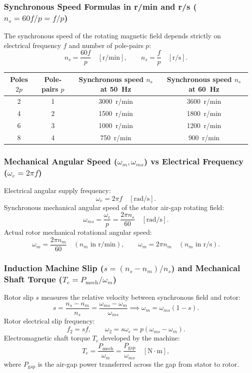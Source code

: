 \subsubsection{Synchronous Speed Formulas in r/min and r/s ($n_s = 60f/p = f/p$)}
The synchronous speed of the rotating magnetic field depends strictly on electrical frequency $f$ and number of pole-pairs $p$:
\[
n_s = \frac{60 f}{p}\quad[\mathrm{r/min}],
\qquad
n_s = \frac{f}{p}\quad[\mathrm{r/s}].
\]
\begin{center}
\begin{tabular}{@{}cccc@{}}
\toprule
Poles $2p$ & Pole-pairs $p$ & Synchronous speed $n_s$ at \SI{50}{\hertz} & Synchronous speed $n_s$ at \SI{60}{\hertz}\\
\midrule
2 & 1 & \SI{3000}{r/min} & \SI{3600}{r/min}\\
4 & 2 & \SI{1500}{r/min} & \SI{1800}{r/min}\\
6 & 3 & \SI{1000}{r/min} & \SI{1200}{r/min}\\
8 & 4 & \SI{750}{r/min}  & \SI{900}{r/min}\\
\bottomrule
\end{tabular}
\end{center}

\subsubsection{Mechanical Angular Speed ($\omega_m, \omega_{ms}$) vs Electrical Frequency ($\omega_e = 2\pi f$)}
Electrical angular supply frequency:
\[
\omega_e = 2\pi f\quad[\mathrm{rad/s}].
\]
Synchronous mechanical angular speed of the stator air-gap rotating field:
\[
\omega_{ms} = \frac{\omega_e}{p} = \frac{2\pi n_s}{60}\quad[\mathrm{rad/s}].
\]
Actual rotor mechanical rotational angular speed:
\[
\omega_m = \frac{2\pi n_m}{60}\quad(n_m\text{ in r/min}),
\qquad
\omega_m = 2\pi n_m\quad(n_m\text{ in r/s}).
\]

\subsubsection{Induction Machine Slip ($s = (n_s - n_m)/n_s$) and Mechanical Shaft Torque ($T_e = P_{\mathrm{mech}}/\omega_m$)}
Rotor slip $s$ measures the relative velocity between synchronous field and rotor:
\[
s = \frac{n_s - n_m}{n_s} = \frac{\omega_{ms} - \omega_m}{\omega_{ms}}
\implies
\omega_m = \omega_{ms}(1 - s).
\]
Rotor electrical slip frequency:
\[
f_2 = s f,
\qquad
\omega_2 = s \omega_e = p(\omega_{ms} - \omega_m).
\]
Electromagnetic shaft torque $T_e$ developed by the machine:
\[
T_e = \frac{P_{\mathrm{mech}}}{\omega_m} = \frac{P_{\mathrm{gap}}}{\omega_{ms}}\quad[\mathrm{N\cdot m}],
\]
where $P_{\mathrm{gap}}$ is the air-gap power transferred across the gap from stator to rotor.

